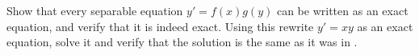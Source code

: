 \documentclass{ximera}
\begin{document}
\begin{exercise}\label{ex:separableExact}%
    \begin{tasks}
        \task Show that every separable equation $y' = f(x)g(y)$ can be written as an exact equation, and verify that it is indeed exact.
        \task Using this rewrite $y' = xy$ as an exact equation, solve it and verify that the solution is the same as it was in .
    \end{tasks}
\end{exercise}

\end{document}
